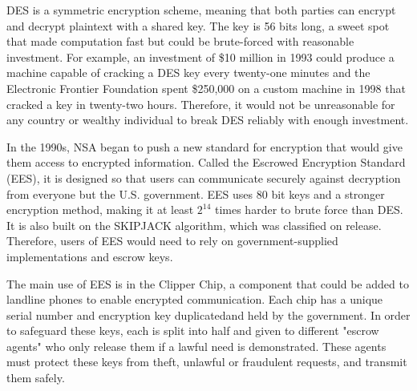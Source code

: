 \documentclass[12pt]{turabian-researchpaper}
\begin{document}
DES is a symmetric encryption scheme, meaning that both parties can encrypt and decrypt plaintext with a shared key.
The key is 56 bits long, a sweet spot that made computation fast but could be brute-forced with reasonable investment.
For example, an investment of \$10 million in 1993 could produce a machine capable of cracking a DES key every twenty-one minutes
  and the Electronic Frontier Foundation spent \$250,000 on a custom machine in 1998 that cracked a key in twenty-two hours.
Therefore, it would not be unreasonable for any country or wealthy individual to break DES reliably with enough investment.

In the 1990s, NSA began to push a new standard for encryption that would give them access to encrypted information.
Called the Escrowed Encryption Standard (EES), it is designed so that users can communicate securely against decryption from everyone but the U.S. government.
EES uses 80 bit keys and a stronger encryption method, making it at least $2^{14}$ times harder to brute force than DES.
It is also built on the SKIPJACK algorithm, which was classified on release. Therefore, users of EES would need to rely on government-supplied implementations and escrow keys.

The main use of EES is in the Clipper Chip, a component that could be added to landline phones to enable encrypted communication.
Each chip has a unique serial number and encryption key duplicatedand held by the government.
In order to safeguard these keys, each is split into half and given to different "escrow agents" who only release them if a lawful need is demonstrated.
These agents must protect these keys from theft, unlawful or fraudulent requests, and transmit them safely.
\end{document}
